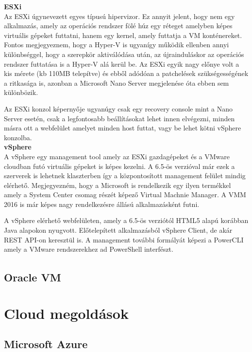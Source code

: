 \documentclass[12pt,oneside,justify,table]{book}
\begin{document}
\noindent \textbf{ESXi} \\
Az ESXi úgynevezett egyes típusú hipervizor. Ez annyit jelent, hogy nem egy alkalmazás, amely az operációs rendszer fölé húz egy réteget amelyben képes virtuális gépeket futtatni, hanem egy kernel, amely futtatja a VM konténereket. Fontos megjegyeznem, hogy a Hyper-V is ugyanígy működik ellenben annyi különbséggel, hogy a szerepkör aktiválódása után, az újrainduláskor az operációs rendszer futtatása is a Hyper-V alá kerül be. Az ESXi egyik nagy előnye volt a kis mérete (kb 110MB telepítve) és ebből adódóan a patchelések szükségességének a ritkasága is, azonban a Microsoft Nano Server megjelenése óta ebben sem különbözik. 

Az ESXi konzol képernyője ugyanúgy csak egy recovery console mint a Nano Server esetén, csak a legfontosabb beállításokat lehet innen elvégezni, minden másra ott a webfelület amelyet minden host futtat, vagy be lehet kötni vSphere konzolba. \\

\noindent \textbf{vSphere} \\
A vSphere egy management tool amely az ESXi gazdagépeket és a VMware cloudban futó virtuális gépeket is képes kezelni. A 6.5-ös verzióval már ezek a szerverek is lehetnek klaszterben így a központosított management felület mindig elérhető. Megjegyezném, hogy a Microsoft is rendelkezik egy ilyen termékkel amely a System Center csomag részét képező Virtual Machnie Manager. A VMM 2016 is már képes nagy rendelkezésre állású alkalmazásként futni. 

A vSphere elérhető webfelületen, amely a 6.5-ös verziótól HTML5 alapú korábban Java alapokon nyugvott. Előtelepített alkalmazásból vSphere Client, de akár REST API-on keresztül is. A management további formályát képezi a PowerCLI amely a VMware rendszerekhez ad PowerShell interfészt.


\subsection{Oracle\textsuperscript{\textregistered} VM}


\section{Cloud megoldások}
\subsection{Microsoft Azure}
\cite{AzureFundamentals}
\end{document}
